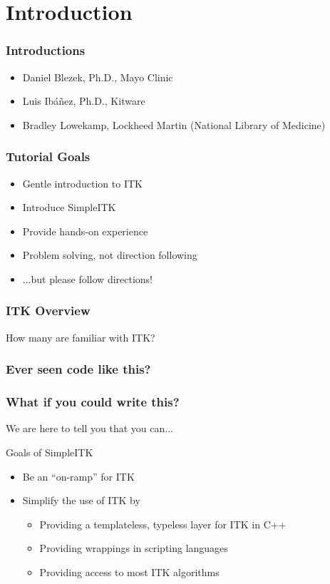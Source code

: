 \section{Introduction}

\begin{frame}
\frametitle{Introductions}

\begin{itemize}
\item Daniel Blezek, Ph.D., Mayo Clinic
\item Luis Ib\'a\~nez, Ph.D., Kitware
\item Bradley Lowekamp, Lockheed Martin (National Library of Medicine)
\end{itemize}

\end{frame}

\begin{frame}
\frametitle{Tutorial Goals}
\begin{itemize}
\item Gentle introduction to ITK
\item Introduce SimpleITK
\item Provide hands-on experience
\item Problem solving, not direction following
\item ...but please follow directions!
\end{itemize}
\end{frame}

\begin{frame}
\frametitle{ITK Overview}
How many are familiar with ITK?
\end{frame}

\begin{frame}
\frametitle{Ever seen code like this?}
\begin{center}
\lstcpp

\end{center}
\end{frame}

\begin{frame}
\frametitle{What if you could write this?}
\begin{center}
\lstpython

\end{center}
\pause
We are here to tell you that you can...
\end{frame}

\begin{frame}{Goals of SimpleITK}
\begin{itemize}
\item Be an ``on-ramp'' for ITK
\item Simplify the use of ITK by
  \begin{itemize}
  \item Providing a templateless, typeless layer for ITK in C++
  \item Providing wrappings in scripting languages
  \item Providing access to most ITK algorithms
\end{itemize}
\end{itemize}
\end{frame}

